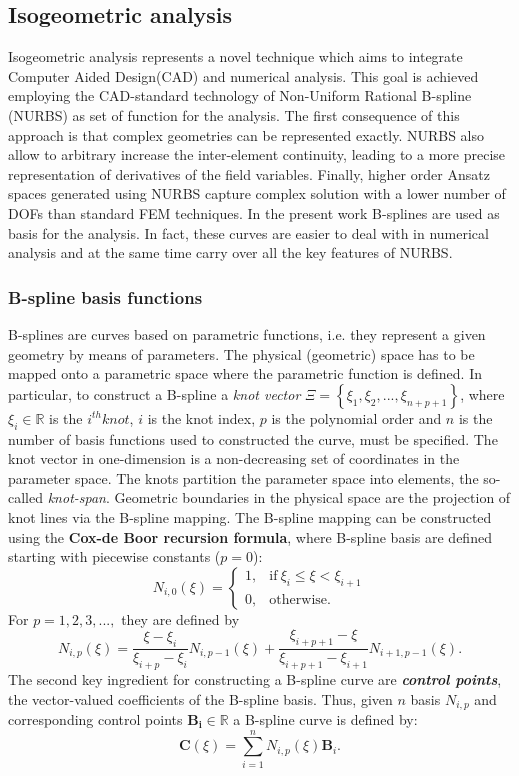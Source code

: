 \documentclass[3p]{article}
\begin{document}
\subsection*{Isogeometric analysis}
Isogeometric analysis represents a novel technique which aims to integrate Computer Aided Design(CAD) and numerical analysis. This goal is achieved employing the CAD-standard technology of Non-Uniform Rational B-spline (NURBS) as set of function for the analysis. The first consequence of this approach is that complex geometries can be represented exactly. NURBS also allow to arbitrary increase the inter-element continuity, leading to a more precise representation of derivatives of the field variables. Finally, higher order Ansatz spaces generated using NURBS capture complex solution with a lower number of DOFs than standard FEM techniques.
In the present work B-splines are used as basis for the analysis. In fact, these curves are easier to deal with in numerical analysis and at the same time carry over all the key features of NURBS.
\subsubsection*{B-spline basis functions}
B-splines are curves based on parametric functions, i.e. they represent a given geometry by means of parameters. The physical (geometric) space has to be mapped onto a parametric space where the parametric function is defined. In particular, to construct a B-spline a \textit{knot vector} $\Xi=\left\lbrace\xi_{1},\xi_{2},...,\xi_{n+p+1}\right\rbrace$, where $\xi_{i} \in \mathbb{R}$ is the $i^{th} knot$, $i$ is the knot index, $p$ is the polynomial order and $n$ is the number of basis functions used to constructed the curve, must be specified. The knot vector in one-dimension is a non-decreasing set of coordinates in the parameter space. The knots partition the parameter space into elements, the so-called \textit{knot-span}. Geometric boundaries in the physical space are the projection of knot lines via the B-spline mapping.
The B-spline mapping can be constructed using the \textbf{Cox-de Boor recursion formula}, where B-spline basis are defined starting with piecewise constants ($p=0$):
\begin{equation}
N_{i,0}(\xi)= 
\begin{cases}
      1, & \text{if}\ \xi_{i} \leqslant \xi < \xi_{i+1} \\
      0, & \text{otherwise}.
\end{cases}
\end{equation}
For $p=1,2,3,...,$ they are defined by
\begin{equation}
N_{i,p}(\xi) = \dfrac{\xi-\xi_{i}}{\xi_{i+p}-\xi_{i}}N_{i,p-1}(\xi)+\dfrac{\xi_{i+p+1}-\xi}{\xi_{i+p+1}-\xi_{i+1}}N_{i+1,p-1}(\xi).
\end{equation}
The second key ingredient for constructing a B-spline curve are \textbf{\textit{control points}}, the vector-valued coefficients of the B-spline basis. Thus, given $n$ basis $N_{i,p}$ and corresponding control points $\mathbf{B_{i}}\in\mathbb{R}$ a B-spline curve is defined by:
\begin{equation}
\mathbf{C}(\xi) = \sum_{i=1}^{n}N_{i,p}(\xi)\mathbf{B}_{i}.
\end{equation}
\end{document}
